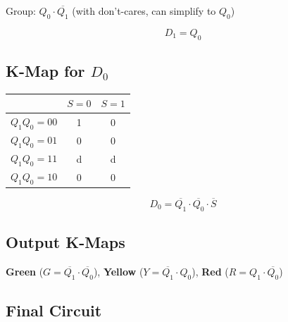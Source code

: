 \documentclass[12pt,a4paper]{article}
\begin{document}
Group: $Q_0 \cdot \overline{Q_1}$ (with don't-cares, can simplify to $Q_0$)

$$\boxed{D_1 = Q_0}$$

\subsection{K-Map for $D_0$}

\begin{table}[H]
\centering
\begin{tabular}{c|cc}
& $S=0$ & $S=1$ \\
\midrule
$Q_1 Q_0 = 00$ & \cellcolor{green!20}1 & 0 \\
$Q_1 Q_0 = 01$ & 0 & 0 \\
$Q_1 Q_0 = 11$ & \cellcolor{gray!20}d & \cellcolor{gray!20}d \\
$Q_1 Q_0 = 10$ & 0 & 0 \\
\end{tabular}
\end{table}

$$\boxed{D_0 = \overline{Q_1} \cdot \overline{Q_0} \cdot \overline{S}}$$

\subsection{Output K-Maps}

\textbf{Green} ($G = \overline{Q_1}\cdot\overline{Q_0}$), \textbf{Yellow} ($Y = \overline{Q_1}\cdot Q_0$), \textbf{Red} ($R = Q_1\cdot\overline{Q_0}$)

\subsection{Final Circuit}
\end{document}
